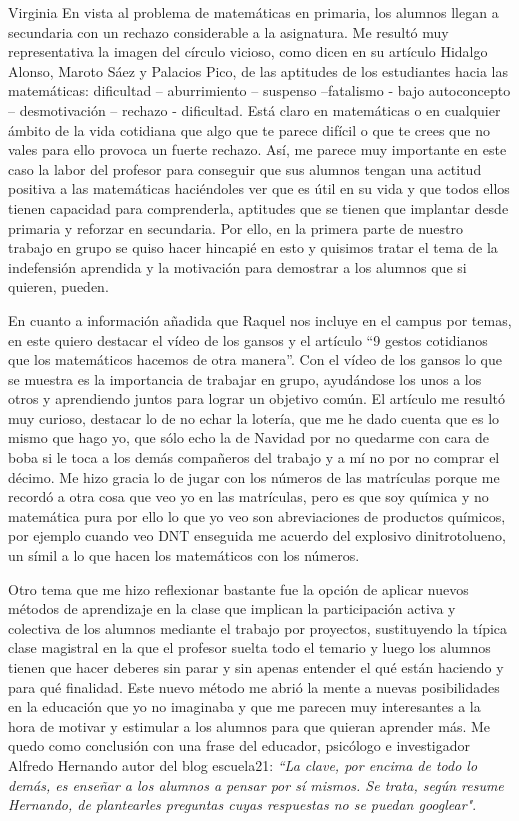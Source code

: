 \begin{opin}{\virgicolor}{Virginia}
En vista al problema de matemáticas en primaria, los alumnos llegan a secundaria con un rechazo considerable a la asignatura. Me resultó muy representativa la imagen del círculo vicioso, como dicen en su artículo Hidalgo Alonso, Maroto Sáez y Palacios Pico, de las aptitudes de los estudiantes hacia las matemáticas: dificultad – aburrimiento – suspenso –fatalismo - bajo autoconcepto – desmotivación – rechazo - dificultad. Está claro en matemáticas o en cualquier ámbito de la vida cotidiana que algo que te parece difícil o que te crees que no vales para ello provoca un fuerte rechazo. Así, me parece muy importante en este caso la labor del profesor para conseguir que sus alumnos tengan una actitud positiva a las matemáticas haciéndoles ver que es útil en su vida y que todos ellos tienen capacidad para comprenderla, aptitudes que se tienen que implantar desde primaria y reforzar en secundaria. Por ello, en la primera parte de nuestro trabajo en grupo se quiso hacer hincapié en esto y quisimos tratar el tema de la indefensión aprendida y la motivación para demostrar a los alumnos que si quieren, pueden.

En cuanto a información añadida que Raquel nos incluye en el campus por temas, en este quiero destacar el vídeo de los gansos y el artículo “9 gestos cotidianos que los matemáticos hacemos de otra manera”. Con el vídeo de los gansos lo que se muestra es la importancia de trabajar en grupo, ayudándose los unos a los otros y aprendiendo juntos para lograr un objetivo común. El artículo me resultó muy curioso, destacar lo de no echar la lotería, que me he dado cuenta que es lo mismo que hago yo, que sólo echo la de Navidad por no quedarme con cara de boba si le toca a los demás compañeros del trabajo y a mí no por no comprar el décimo. Me hizo gracia lo de jugar con los números de las matrículas porque me recordó a otra cosa que veo yo en las matrículas, pero es que soy química y no matemática pura por ello lo que yo veo son abreviaciones de productos químicos, por ejemplo cuando veo DNT enseguida me acuerdo del explosivo dinitrotolueno, un símil a lo que hacen los matemáticos con los números.

Otro tema que me hizo reflexionar bastante fue la opción de aplicar nuevos métodos de aprendizaje en la clase que implican la participación activa y colectiva de los alumnos mediante el trabajo por proyectos, sustituyendo la típica clase magistral en la que el profesor suelta todo el temario y luego los alumnos tienen que hacer deberes sin parar y sin apenas entender el qué están haciendo y para qué finalidad. Este nuevo método me abrió la mente a nuevas posibilidades en la educación que yo no imaginaba y que me parecen muy interesantes a la hora de motivar y estimular a los alumnos para que quieran aprender más. Me quedo como conclusión con una frase del educador, psicólogo e investigador Alfredo Hernando autor del blog escuela21: \textit{“La clave, por encima de todo lo demás, es enseñar a los alumnos a pensar por sí mismos. Se trata, según resume Hernando, de plantearles preguntas cuyas respuestas no se puedan googlear"}.

\end{opin}
